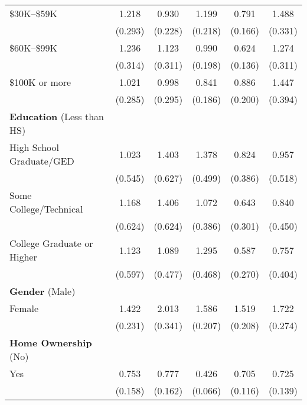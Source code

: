 \begin{table}[htbp]
\begin{tabular}{l*{5}{c}}
\$30K--\$59K        &       1.218         &       0.930         &       1.199         &       0.791         &       1.488\sym{*}  \\
                    &     (0.293)         &     (0.228)         &     (0.218)         &     (0.166)         &     (0.331)         \\
\$60K--\$99K        &       1.236         &       1.123         &       0.990         &       0.624\sym{**} &       1.274         \\
                    &     (0.314)         &     (0.311)         &     (0.198)         &     (0.136)         &     (0.311)         \\
\$100K or more      &       1.021         &       0.998         &       0.841         &       0.886         &       1.447         \\
                    &     (0.285)         &     (0.295)         &     (0.186)         &     (0.200)         &     (0.394)         \\
\textbf{Education} (Less than HS) &  &  &  &   & \\
High School Graduate/GED&       1.023         &       1.403         &       1.378         &       0.824         &       0.957         \\
                    &     (0.545)         &     (0.627)         &     (0.499)         &     (0.386)         &     (0.518)         \\
Some College/Technical&       1.168         &       1.406         &       1.072         &       0.643         &       0.840         \\
                    &     (0.624)         &     (0.624)         &     (0.386)         &     (0.301)         &     (0.450)         \\
College Graduate or Higher&       1.123         &       1.089         &       1.295         &       0.587         &       0.757         \\
                    &     (0.597)         &     (0.477)         &     (0.468)         &     (0.270)         &     (0.404)         \\
\textbf{Gender} (Male) &  &  &  &   & \\
Female              &       1.422\sym{**} &       2.013\sym{***}&       1.586\sym{***}&       1.519\sym{***}&       1.722\sym{***}\\
                    &     (0.231)         &     (0.341)         &     (0.207)         &     (0.208)         &     (0.274)         \\
\textbf{Home Ownership} (No) &  &  &  &   & \\
Yes                 &       0.753         &       0.777         &       0.426\sym{***}&       0.705\sym{**} &       0.725\sym{*}  \\
                    &     (0.158)         &     (0.162)         &     (0.066)         &     (0.116)         &     (0.139)         \\


\end{tabular}
\end{table}
